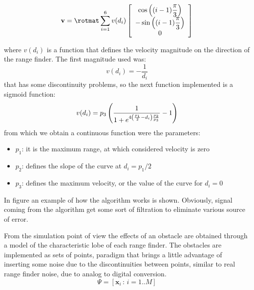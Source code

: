 \begin{equation}
\mathbf{v} = \rotmat \sum\limits_{i=1}^{6}v(d_i)\vettore{\cos\braces{(i-1)\dfrac{\pi}{3}} \\ -\sin\braces{(i-1)\dfrac{\pi}{3}} \\0}
\end{equation}

where ${v(d_i)}$ is a function that defines the velocity magnitude on the direction of the range finder. The first magnitude used was:
\begin{equation}
v(d_i) = - \dfrac{1}{d_i}
\end{equation}
that has some discontinuity problems, so the next function implemented is a sigmoid function:
\begin{equation}
v(d_i) = p_3 \left( \dfrac{1}{1+e^{4 \left( \frac{p_1}{2}-d_i \right)\frac{p_2}{p_3}}}-1 \right)
\end{equation}
from which we obtain a continuous function were the parameters:
\begin{itemize}
\item $p_1$: it is the maximum range, at which considered velocity is zero
\item $p_2$: defines the slope of the curve at ${d_i = p_1/2}$
\item $p_3$: defines the maximum velocity, or the value of the curve for ${d_i = 0}$
\end{itemize}

In figure \TODO{\ref{fig:obstavoidexample}} an example of how the algorithm works is shown. Obviously, signal coming from the algorithm get some sort of filtration to eliminate various source of error.

From the simulation point of view the effects of an obstacle are obtained through a model of the characteristic lobe of each range finder. The obstacles are implemented as sets of points, paradigm that brings a little advantage of inserting some noise due to the discontinuities between points, similar to real range finder noise, due to analog to digital conversion.
\begin{equation}
\Psi = \left[ \mathbf{x}_i \,:\,i=1..M  \right]
\end{equation}

